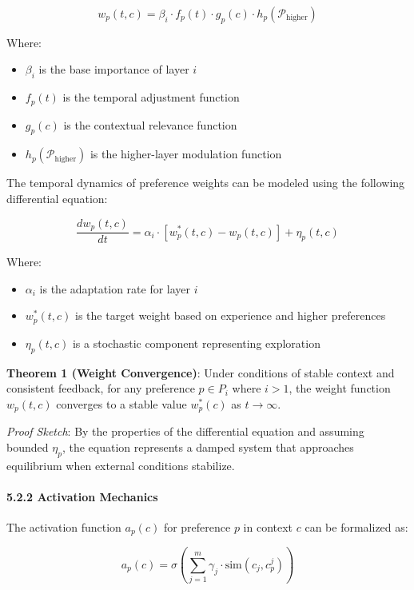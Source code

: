 \documentclass[
]{article}
\providecommand{\tightlist}{%
  \setlength{\itemsep}{0pt}\setlength{\parskip}{0pt}}
\begin{document}
\[w_p(t, c) = \beta_i \cdot f_p(t) \cdot g_p(c) \cdot h_p(\mathcal{P}_{\text{higher}})\]

Where:

\begin{itemize}
\tightlist
\item
  \(\beta_i\) is the base importance of layer \(i\)
\item
  \(f_p(t)\) is the temporal adjustment function
\item
  \(g_p(c)\) is the contextual relevance function
\item
  \(h_p(\mathcal{P}_{\text{higher}})\) is the higher-layer modulation
  function
\end{itemize}

The temporal dynamics of preference weights can be modeled using the
following differential equation:

\[\frac{dw_p(t, c)}{dt} = \alpha_i \cdot [w_p^*(t, c) - w_p(t, c)] + \eta_p(t, c)\]

Where:

\begin{itemize}
\tightlist
\item
  \(\alpha_i\) is the adaptation rate for layer \(i\)
\item
  \(w_p^*(t, c)\) is the target weight based on experience and higher
  preferences
\item
  \(\eta_p(t, c)\) is a stochastic component representing exploration
\end{itemize}

\textbf{Theorem 1 (Weight Convergence)}: Under conditions of stable
context and consistent feedback, for any preference \(p \in P_i\) where
\(i > 1\), the weight function \(w_p(t, c)\) converges to a stable value
\(w_p^*(c)\) as \(t \rightarrow \infty\).

\emph{Proof Sketch}: By the properties of the differential equation and
assuming bounded \(\eta_p\), the equation represents a damped system
that approaches equilibrium when external conditions stabilize.

\paragraph{5.2.2 Activation Mechanics}\label{activation-mechanics}

The activation function \(a_p(c)\) for preference \(p\) in context \(c\)
can be formalized as:

\[a_p(c) = \sigma\left(\sum_{j=1}^m \gamma_j \cdot \text{sim}(c_j, c_p^j)\right)\]
\end{document}
